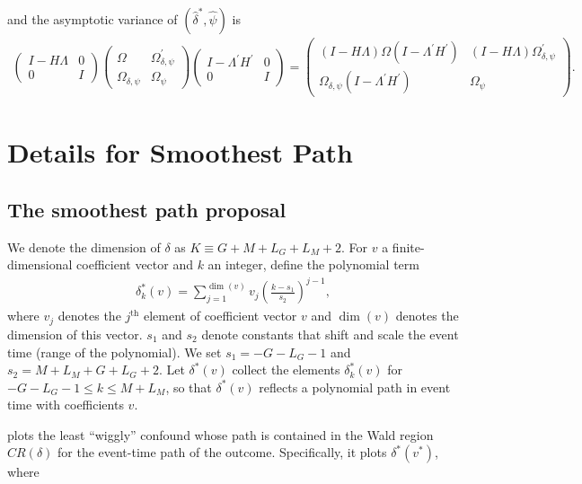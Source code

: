 \documentclass[bib]{./sty/statapress}
\begin{document}
and the asymptotic variance of $\left(\hat{\delta}^{*},\hat{\psi}\right)$ is
\begin{align*}
\begin{pmatrix}I-H\Lambda & 0\\
0 & I
\end{pmatrix}\begin{pmatrix}\Omega & \Omega_{\delta,\psi}^{\prime}\\
\Omega_{\delta,\psi} & \Omega_{\psi}
\end{pmatrix}\begin{pmatrix}I-\Lambda^{\prime}H^{\prime} & 0\\
0 & I
\end{pmatrix}=\begin{pmatrix}(I-H\Lambda)\Omega(I-\Lambda^{\prime}H^{\prime}) & (I-H\Lambda)\Omega_{\delta,\psi}^{\prime}\\
\Omega_{\delta,\psi}(I-\Lambda^{\prime}H^{\prime}) & \Omega_{\psi}
\end{pmatrix}.
\end{align*}

\section{Details for Smoothest Path}
\label{sec:smoothest_path}

\subsection{The smoothest path proposal}

We denote the dimension of $\delta$ as $K \equiv G + M + L_G + L_M + 2$. For $v$ a finite-dimensional coefficient vector and $k$ an integer, define the polynomial term
\begin{align*}
\delta_k^*(v) = \sum_{j=1}^{\dim(v)} v_j (\frac{k-s_1}{s_2})^{j-1},
\end{align*}
 where $v_j$ denotes the $j^{\text{th}}$ element of coefficient vector $v$ and $\dim(v)$ denotes the dimension of this vector. $s_1$ and $s_2$ denote constants that shift and scale the event time (range of the polynomial). We set $s_1 = -G-L_G-1$ and $s_2 = M + L_M + G + L_G +2$. Let $\delta^*(v)$ collect the elements $\delta_k^*(v)$ for $-G-L_G-1 \leq k \leq M+L_M$, so that $\delta^*(v)$ reflects a polynomial path in event time with coefficients $v$.

\xtevent plots the least ``wiggly'' confound whose path is contained in the Wald region $CR(\delta)$ for the event-time path of the outcome. Specifically, it plots $\delta^*(v^*)$, where
\end{document}
